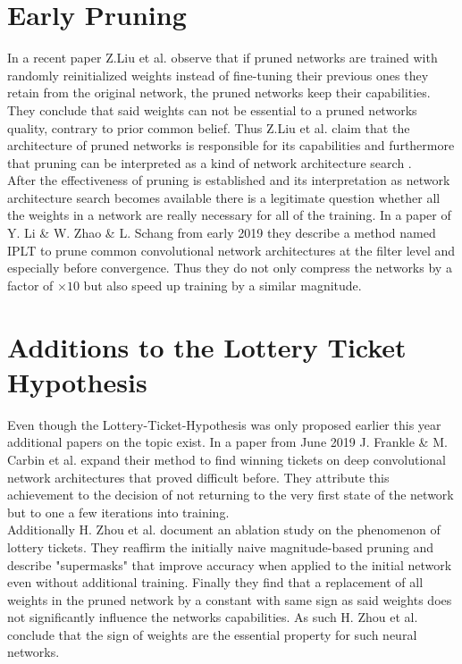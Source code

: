 \section{Early Pruning}
In a recent paper \cite{Rethinking-Network-Pruning} Z.Liu et al. observe that if pruned networks are trained with randomly reinitialized weights instead of fine-tuning their previous ones they retain from the original network, the pruned networks keep their capabilities. They conclude that said weights can not be essential to a pruned networks quality, contrary to prior common belief. Thus Z.Liu et al. claim that the architecture of pruned networks is responsible for its capabilities and furthermore that pruning can be interpreted as a kind of network architecture search .\\
After the effectiveness of pruning is established and its interpretation as network architecture search becomes available there is a legitimate question whether all the weights in a network are really necessary for all of the training. In a paper of Y. Li \& W. Zhao \& L. Schang from early 2019 \cite{Pruning-With-Little-Training} they describe a method named IPLT to prune common convolutional network architectures at the filter level and especially before convergence. Thus they do not only compress the networks by a factor of $\times10$ but also speed up training by a similar magnitude. 

\section{Additions to the Lottery Ticket Hypothesis}
Even though the Lottery-Ticket-Hypothesis was only proposed earlier this year additional papers on the topic exist.
In a paper from June 2019 J. Frankle \& M. Carbin et al. \cite{LTH-At-Scale} expand their method to find winning tickets on deep convolutional network architectures that proved difficult before. They attribute this achievement to the decision of not returning to the very first state of the network but to one a few iterations into training.\\
Additionally H. Zhou et al. \cite{Deconstructing_LTH} document an ablation study on the phenomenon of lottery tickets. They reaffirm the initially naive magnitude-based pruning and describe "supermasks" that improve accuracy when applied to the initial network even without additional training. Finally they find that a replacement of all weights in the pruned network by a constant with same sign as said weights does not significantly influence the networks capabilities. As such H. Zhou et al. conclude that the sign of weights are the essential property for such neural networks. 


